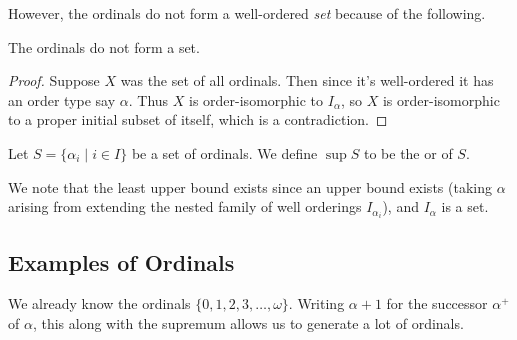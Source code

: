 \documentclass[a4paper, 10pt, twocolumn]{amsart}
\begin{document}
However, the ordinals do not form a well-ordered \emph{set} because of the following.

\begin{theorem}
  The ordinals do not form a set.
\end{theorem}
\begin{proof}
  Suppose $X$ was the set of all ordinals. Then since it's well-ordered it has an order type say $\alpha$. Thus $X$ is order-isomorphic to $I_\alpha$, so $X$ is order-isomorphic to a proper initial subset of itself, which is a contradiction.
\end{proof}

\begin{definition}[Supremum]
  Let $S = \{\alpha_i \mid i \in I\}$ be a set of ordinals. We define $\sup S$ to be the  or  of $S$.
\end{definition}

We note that the least upper bound exists since an upper bound exists (taking $\alpha$ arising from extending the nested family of well orderings $I_{\alpha_i}$), and $I_{\alpha}$ is a set.

\subsection{Examples of Ordinals}
We already know the ordinals $\{0, 1, 2, 3, \dots, \omega\}$. Writing $\alpha + 1$ for the successor $\alpha^+$ of $\alpha$, this along with the supremum allows us to generate a lot of ordinals. 
\end{document}
